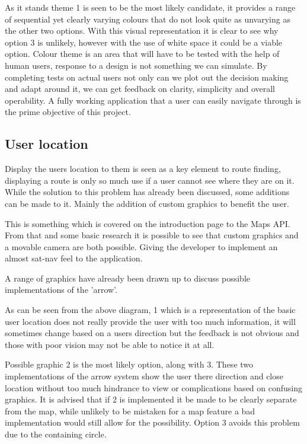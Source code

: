 As it stands theme 1 is seen to be the most likely candidate, it provides a range of sequential yet clearly varying colours that do not look quite as unvarying as the other two options. With this visual representation it is clear to see why option 3 is unlikely, however with the use of white space it could be a viable option. Colour theme is an area that will have to be tested with the help of human users, response to a design is not something we can simulate. By completing tests on actual users not only can we plot out the decision making and adapt around it, we can get feedback on clarity, simplicity and overall operability. A fully working application that a user can easily navigate through is the prime objective of this project. 
\subsection{User location}
Display the users location to them is seen as a key element to route finding, displaying a route is only so much use if a user cannot see where they are on it. While the solution to this problem has already been discussed, some additions can be made to it. Mainly the addition of custom graphics to benefit the user. 

This is something which is covered on the introduction page to the Maps API\cite{maps}. From that and some basic research it is possible to see that custom graphics and a movable camera are both possible. Giving the developer to implement an almost sat-nav feel to the application. 

A range of graphics have already been drawn up to discuss possible implementations of the 'arrow'.

As can be seen from the above diagram, 1 which is a representation of the basic user location does not really provide the user with too much information, it will sometimes change based on a users direction but the feedback is not obvious and those with poor vision may not be able to notice it at all. 

Possible graphic 2 is the most likely option, along with 3. These two implementations of the arrow system show the user there direction and close location without too much hindrance to view or complications based on confusing graphics. It is advised that if 2 is implemented it be made to be clearly separate from the map, while unlikely to be mistaken for a map feature a bad implementation would still allow for the possibility. Option 3 avoids this problem due to the containing circle.

